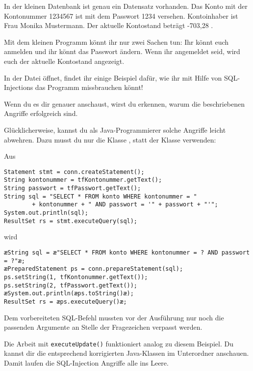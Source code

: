 In der kleinen Datenbank ist genau ein Datensatz vorhanden. Das Konto mit der
Kontonummer 1234567 ist mit dem Passwort 1234 versehen. Kontoinhaber ist Frau
Monika Mustermann. Der aktuelle Kontostand beträgt -703,28 \texteuro .

Mit dem kleinen Programm könnt ihr nur zwei Sachen tun: Ihr könnt euch anmelden
und ihr könnt das Passwort ändern. Wenn ihr angemeldet seid, wird euch der
aktuelle Kontostand angezeigt.

In der Datei  öffnet, findet ihr einige
Beispiel dafür, wie ihr mit Hilfe von SQL-Injections das Programm missbrauchen
könnt!

Wenn du es dir genauer anschaust, wirst du erkennen, warum die beschriebenen
Angriffe erfolgreich sind.

Glücklicherweise, kannst du als Java-Programmierer solche Angriffe leicht
abwehren. Dazu musst du nur die Klasse , statt der
Klasse  verwenden:

Aus

\begin{lstlisting}
Statement stmt = conn.createStatement();
String kontonummer = tfKontonummer.getText();
String passwort = tfPasswort.getText();
String sql = "SELECT * FROM konto WHERE kontonummer = " 
        + kontonummer + " AND passwort = '" + passwort + "'";
System.out.println(sql);
ResultSet rs = stmt.executeQuery(sql);
\end{lstlisting}

wird

\begin{lstlisting}
æString sql = æ"SELECT * FROM konto WHERE kontonummer = ? AND passwort = ?"æ;
æPreparedStatement ps = conn.prepareStatement(sql); 
ps.setString(1, tfKontonummer.getText());
ps.setString(2, tfPasswort.getText());
æSystem.out.println(æps.toString()æ);
ResultSet rs = æps.executeQuery()æ;
\end{lstlisting}

Dem vorbereiteten SQL-Befehl mussten vor der Ausführung nur noch die passenden
Argumente an Stelle der Fragezeichen verpasst werden.

Die Arbeit mit \lstinline|executeUpdate()| funktioniert analog zu diesem
Beispiel. Du kannst dir die entsprechend korrigierten Java-Klassen im
Unterordner  anschauen. Damit laufen die SQL-Injection
Angriffe alle ins Leere.
